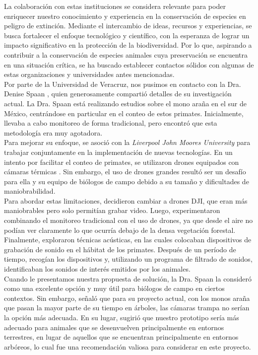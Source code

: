 \noindent La colaboración con estas instituciones se considera relevante para poder enriquecer nuestro conocimiento y experiencia en la conservación de especies en peligro de extinción. Mediante el intercambio de ideas, recursos y experiencias, se busca fortalecer el enfoque tecnológico y científico, con la esperanza de lograr un impacto significativo en la protección de la biodiversidad. Por lo que, aspirando a contribuir a la conservación de especies animales cuya preservación se encuentra en una situación crítica, se ha buscado establecer contactos sólidos con algunas de estas organizaciones y universidades antes mencionadas.\\
Por parte de la Universidad de Veracruz, nos pusimos en contacto con la Dra. Denise Spaan \cite{109}, quien generosamente compartió detalles de su investigación actual. La Dra. Spaan está realizando estudios sobre el mono araña en el sur de México, centrándose en particular en el conteo de estos primates. Inicialmente, llevaba a cabo monitoreo de forma tradicional, pero encontró que esta metodología era muy agotadora.\\
Para mejorar su enfoque, se asoció con la\textit{ Liverpool John Moores University }para trabajar conjuntamente en la implementación de nuevas tecnologías. En un intento por facilitar el conteo de primates, se utilizaron drones equipados con cámaras térmicas \cite{110}. Sin embargo, el uso de drones grandes resultó ser un desafío para ella y su equipo de biólogos de campo debido a su tamaño y dificultades de maniobrabilidad.\\
Para abordar estas limitaciones, decidieron cambiar a drones DJI, que eran más maniobrables pero solo permitían grabar video. Luego, experimentaron combinando el monitoreo tradicional con el uso de drones, ya que desde el aire no podían ver claramente lo que ocurría debajo de la densa vegetación forestal.\\
Finalmente, exploraron técnicas acústicas, en las cuales colocaban dispositivos de grabación de sonido en el hábitat de los primates. Después de un período de tiempo, recogían los dispositivos y, utilizando un programa de filtrado de sonidos, identificaban los sonidos de interés emitidos por los animales.\\
Cuando le presentamos nuestra propuesta de solución, la Dra. Spaan la consideró como una excelente opción y muy útil para biólogos de campo en ciertos contextos. Sin embargo, señaló que para su proyecto actual, con los monos araña que pasan la mayor parte de su tiempo en árboles, las cámaras trampa no serían la opción más adecuada.  En su lugar, sugirió que nuestro prototipo sería más adecuado para animales que se desenvuelven principalmente en entornos terrestres, en lugar de aquellos que se encuentran principalmente en entornos arbóreos, lo cual fue una recomendación valiosa para considerar en este proyecto. \\
